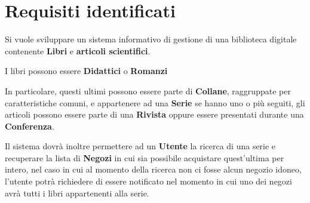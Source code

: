 \chapter{Requisiti identificati}
Si vuole sviluppare un sistema informativo di gestione di una biblioteca digitale contenente \textbf{Libri} e
\textbf{articoli scientifici}.

I libri possono essere \textbf{Didattici} o \textbf{Romanzi}

In particolare, questi ultimi possono essere parte di \textbf{Collane}, raggruppate per caratteristiche
comuni, e appartenere ad una \textbf{Serie} se hanno uno o più seguiti, gli articoli possono essere parte
di una \textbf{Rivista} oppure essere presentati durante una \textbf{Conferenza}.

Il sistema dovrà inoltre permettere ad un \textbf{Utente} la ricerca di una serie
e recuperare la lista di \textbf{Negozi} in cui sia possibile acquistare quest'ultima per intero,
nel caso in cui al momento della ricerca non ci fosse alcun negozio idoneo, l'utente potrà richiedere
di essere notificato nel momento in cui uno dei negozi avrà tutti i libri appartenenti alla serie.